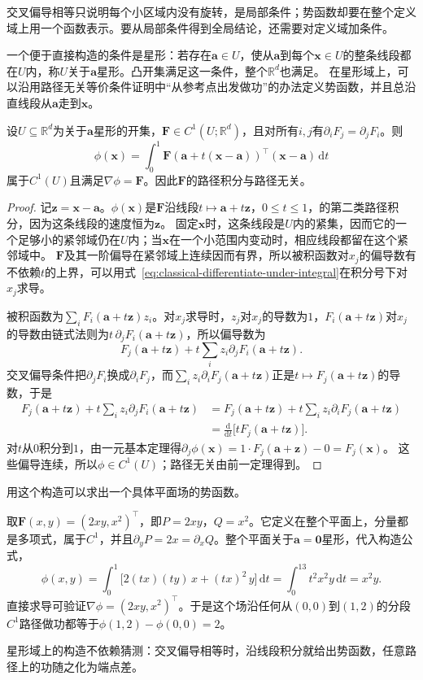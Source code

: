 交叉偏导相等只说明每个小区域内没有旋转，是局部条件；势函数却要在整个定义域上用一个函数表示。要从局部条件得到全局结论，还需要对定义域加条件。

一个便于直接构造的条件是星形：若存在$\bm a\in U$，使从$\bm a$到每个$\bm x\in U$的整条线段都在$U$内，称$U$关于$\bm a$星形。凸开集满足这一条件，整个$\mathbb R^d$也满足。
在星形域上，可以沿用路径无关等价条件证明中“从参考点出发做功”的办法定义势函数，并且总沿直线段从$\bm a$走到$\bm x$。
\begin{theorem}[星形域上势函数的构造]
设$U\subseteq\mathbb R^d$为关于$\bm a$星形的开集，$\bm F\in C^1(U;\mathbb R^d)$，且对所有$i,j$有$\partial_iF_j=\partial_jF_i$。则
\[
 \phi(\bm x)=\int_0^1\bm F(\bm a+t(\bm x-\bm a))^\top(\bm x-\bm a)\,\mathrm dt
\]
属于$C^1(U)$且满足$\nabla\phi=\bm F$。因此$\bm F$的路径积分与路径无关。
\end{theorem}
\begin{proof}
记$\bm z=\bm x-\bm a$。$\phi(\bm x)$是$\bm F$沿线段$t\mapsto\bm a+t\bm z$，$0\leq t\leq1$，的第二类路径积分，因为这条线段的速度恒为$\bm z$。
固定$\bm x$时，这条线段是$U$内的紧集，因而它的一个足够小的紧邻域仍在$U$内；当$\bm x$在一个小范围内变动时，相应线段都留在这个紧邻域中。
$\bm F$及其一阶偏导在紧邻域上连续因而有界，所以被积函数对$x_j$的偏导数有不依赖$t$的上界，可以用式~\eqref{eq:classical-differentiate-under-integral}在积分号下对$x_j$求导。

被积函数为$\sum_iF_i(\bm a+t\bm z)z_i$。对$x_j$求导时，$z_j$对$x_j$的导数为$1$，$F_i(\bm a+t\bm z)$对$x_j$的导数由链式法则为$t\,\partial_jF_i(\bm a+t\bm z)$，所以偏导数为
\[
 F_j(\bm a+t\bm z)+t\sum_i z_i\partial_jF_i(\bm a+t\bm z).
\]
交叉偏导条件把$\partial_jF_i$换成$\partial_iF_j$，而$\sum_iz_i\partial_iF_j(\bm a+t\bm z)$正是$t\mapsto F_j(\bm a+t\bm z)$的导数，于是
\[
 \begin{aligned}
 F_j(\bm a+t\bm z)+t\sum_i z_i\partial_jF_i(\bm a+t\bm z)
 &=F_j(\bm a+t\bm z)+t\sum_i z_i\partial_iF_j(\bm a+t\bm z)\\
 &=\frac{\mathrm d}{\mathrm dt}\bigl[tF_j(\bm a+t\bm z)\bigr].
 \end{aligned}
\]
对$t$从$0$积分到$1$，由一元基本定理得$\partial_j\phi(\bm x)=1\cdot F_j(\bm a+\bm z)-0=F_j(\bm x)$。
这些偏导连续，所以$\phi\in C^1(U)$；路径无关由前一定理得到。
\end{proof}

用这个构造可以求出一个具体平面场的势函数。
\begin{example}[沿线段构造势函数$x^2y$]
取$\bm F(x,y)=(2xy,x^2)^\top$，即$P=2xy$，$Q=x^2$。它定义在整个平面上，分量都是多项式，属于$C^1$，并且$\partial_yP=2x=\partial_xQ$。整个平面关于$\bm a=\bm0$星形，代入构造公式，
\[
 \phi(x,y)=\int_0^1\bigl[2(tx)(ty)\,x+(tx)^2\,y\bigr]\,\mathrm dt
 =\int_0^13t^2x^2y\,\mathrm dt=x^2y.
\]
直接求导可验证$\nabla\phi=(2xy,x^2)^\top$。于是这个场沿任何从$(0,0)$到$(1,2)$的分段$C^1$路径做功都等于$\phi(1,2)-\phi(0,0)=2$。
\end{example}
星形域上的构造不依赖猜测：交叉偏导相等时，沿线段积分就给出势函数，任意路径上的功随之化为端点差。


